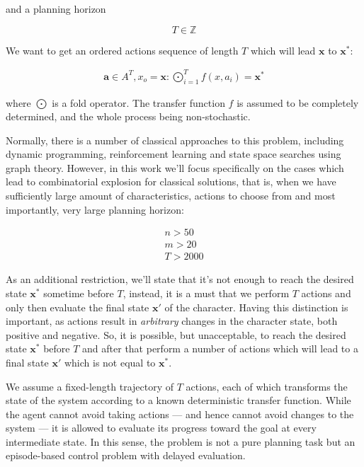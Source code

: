 \documentclass[11pt, a4paper]{article}
\begin{document}
	and a planning horizon
	
	\begin{equation}
		T \in \mathbb{Z}
	\end{equation}

	We want to get an ordered actions sequence of length $T$ which will lead $\mathbf{x}$ to $\mathbf{x}^*$:
	
	\begin{eqnarray}
		\mathbf{a} \in A^T, x_o = \mathbf{x}: \bigodot_{i=1}^{T} f(x, a_i) = \mathbf{x}^*
	\end{eqnarray}
	
	where $\bigodot$ is a fold operator.
	The transfer function $f$ is assumed to be completely determined, and the whole process being non-stochastic.
		
	Normally, there is a number of classical approaches to this problem, including dynamic programming, reinforcement learning and state space searches using graph theory.
	However, in this work we'll focus specifically on the cases which lead to combinatorial explosion for classical solutions, that is, when we have sufficiently large amount of characteristics, actions to choose from and most importantly, very large planning horizon:
	
	\begin{eqnarray}
		n > 50 \\
		m > 20 \\
		T > 2000
	\end{eqnarray}
	
	As an additional restriction, we'll state that it's not enough to reach the desired state $\mathbf{x}^*$ sometime before $T$, instead, it is a must that we perform $T$ actions and only then evaluate the final state $\mathbf{x}'$ of the character.
	Having this distinction is important, as actions result in \textit{arbitrary} changes in the character state, both positive and negative.
	So, it is possible, but unacceptable, to reach the desired state $\mathbf{x}^*$ before $T$ and after that perform a number of actions which will lead to a final state $\mathbf{x}'$ which is not equal to $\mathbf{x}^*$.


We assume a fixed-length trajectory of $𝑇$ actions, each of which transforms the state of the system according to a known deterministic transfer function. While the agent cannot avoid taking actions — and hence cannot avoid changes to the system — it is allowed to evaluate its progress toward the goal at every intermediate state. In this sense, the problem is not a pure planning task but an episode-based control problem with delayed evaluation.
\end{document}
